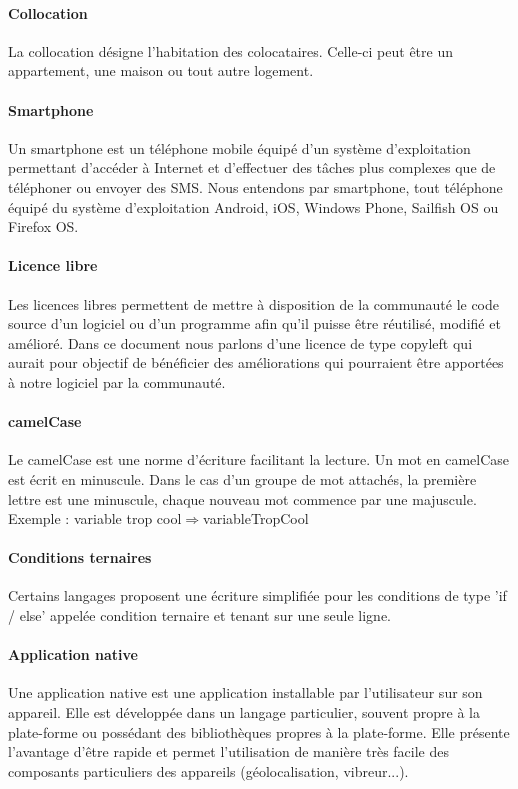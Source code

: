 \paragraph{Collocation}
La collocation désigne l'habitation des colocataires. Celle-ci peut être un appartement, une maison ou tout autre logement.

\paragraph{Smartphone}
Un smartphone est un téléphone mobile équipé d'un système d'exploitation permettant d’accéder à Internet et d'effectuer des tâches plus complexes que de téléphoner ou envoyer des SMS. Nous entendons par smartphone, tout téléphone équipé du système d'exploitation Android, iOS, Windows Phone, Sailfish OS ou Firefox OS.

\paragraph{Licence libre}
Les licences libres permettent de mettre à disposition de la communauté le code source d'un logiciel ou d'un programme afin qu'il puisse être réutilisé, modifié et amélioré. Dans ce document nous parlons d'une licence de type copyleft qui aurait pour objectif de bénéficier des améliorations qui pourraient être apportées à notre logiciel par la communauté.

\paragraph{camelCase}
Le camelCase est une norme d'écriture facilitant la lecture. Un mot en camelCase est écrit en minuscule. Dans le cas d'un groupe de mot attachés, la première lettre est une minuscule, chaque nouveau mot commence par une majuscule.\\
Exemple : variable trop cool$ \Rightarrow $variableTropCool

\paragraph{Conditions ternaires}
Certains langages proposent une écriture simplifiée pour les conditions de type 'if / else' appelée condition ternaire et tenant sur une seule ligne.

\paragraph{Application native}
Une application native est une application installable par l'utilisateur sur son appareil. Elle est développée dans un langage particulier, souvent propre à la plate-forme ou possédant des bibliothèques propres à la plate-forme. Elle présente l'avantage d'être rapide et permet l'utilisation de manière très facile des composants particuliers des appareils (géolocalisation, vibreur...).

